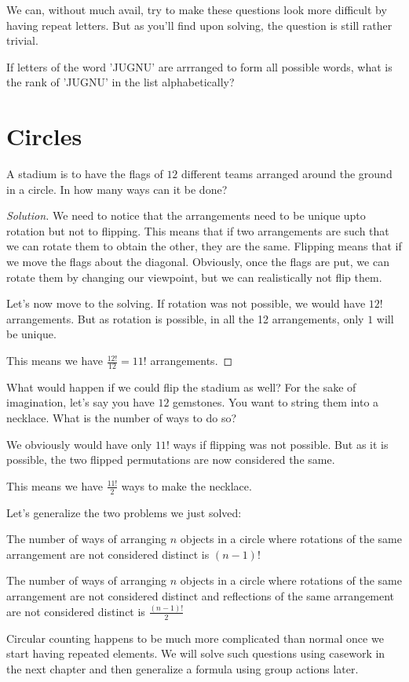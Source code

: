 We can, without much avail, try to make these questions look more difficult by having repeat letters. 
But as you'll find upon solving, the question is still rather trivial.
\begin{example}
    If letters of the word 'JUGNU' are arrranged to form all possible words, what is the rank of 'JUGNU' 
    in the list alphabetically?
\end{example}
\section{Circles}
\begin{example}
A stadium is to have the flags of $12$ different teams arranged around the ground in a circle. 
In how many ways can it be done?  
\end{example}
\begin{proof}
    [Solution]
    We need to notice that the arrangements need to be unique upto rotation but not to flipping. 
    This means that if two arrangements are such that we can rotate them to obtain the other, 
    they are the same. Flipping means that if we move the flags about the diagonal. Obviously, 
    once the flags are put, we can rotate them by changing our viewpoint, but we can realistically 
    not flip them.\par
    Let's now move to the solving. If rotation was not possible, we would have $12!$ arrangements. 
    But as rotation is possible, in all the 12 arrangements, only $1$ will be unique.\par
    This means we have $\frac{12!}{12}=11!$ arrangements.
\end{proof}
What would happen if we could flip the stadium as well? For the sake of imagination, 
let's say you have $12$ gemstones. You want to string them into a necklace. 
What is the number of ways to do so?\par
We obviously would have only $11!$ ways if flipping was not possible. But as it is possible, 
the two flipped permutations are now considered the same.\par
This means we have $\frac{11!}{2}$ ways to make the necklace.\par
Let's generalize the two problems we just solved:
\begin{theorem}
The number of ways of arranging $n$ objects in a circle where rotations of the same 
arrangement are not considered distinct is $(n - 1)!$
\end{theorem}
\begin{theorem}
The number of ways of arranging $n$ objects in a circle where 
rotations of the same arrangement are not considered distinct and reflections 
of the same arrangement are not considered distinct is $\frac{(n-1)!}{2}$
\end{theorem}
Circular counting happens to be much more complicated than normal once we start having repeated elements. 
We will solve such questions using casework in the next chapter and then generalize a formula using group 
actions later.\par
